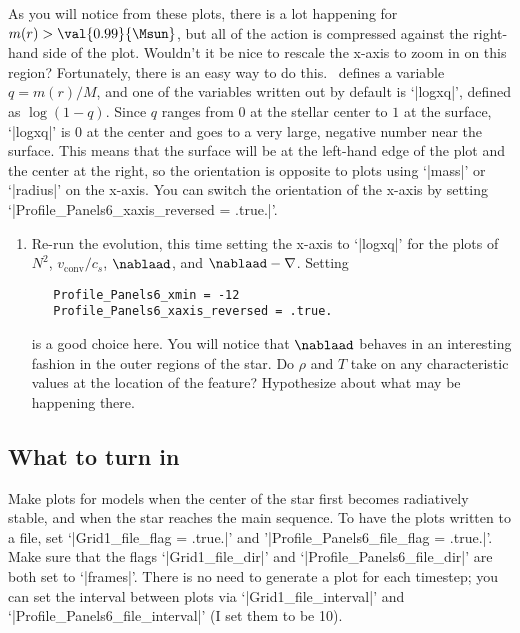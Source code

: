 As you will notice from these plots, there is a lot happening for $m(r) > \val{0.99}{\Msun}$, but all of the action is compressed against the right-hand side of the plot.  Wouldn't it be nice to rescale the x-axis to zoom in on this region?  Fortunately, there is an easy way to do this.  \mesa\ defines a variable $q = m(r)/M$, and one of the variables written out by default is `|logxq|', defined as $\log(1-q)$. Since $q$ ranges from $0$ at the stellar center to $1$ at the surface, `|logxq|' is $0$ at the center and goes to a very large, negative number near the surface. This means that the surface will be at the left-hand edge of the plot and the center at the right, so the orientation is opposite to plots using `|mass|' or `|radius|' on the x-axis.  You can switch the orientation of the x-axis by setting `|Profile_Panels6_xaxis_reversed = .true.|'.

\begin{exercisebox}
\begin{enumerate}
\item Re-run the evolution, this time setting the x-axis to `|logxq|' for the plots of $N^{2}$, $v_{\mathrm{conv}}/c_{s}$, $\nablaad$, and $\nablaad-\nabla$.  Setting
\begin{Verbatim}
   Profile_Panels6_xmin = -12
   Profile_Panels6_xaxis_reversed = .true.
\end{Verbatim}
is a good choice here. You will notice that $\nablaad$ behaves in an interesting fashion in the outer regions of the star.  Do $\rho$ and $T$ take on any characteristic values at the location of the feature?  Hypothesize about what may be happening there.
\end{enumerate}
\end{exercisebox}

\subsection{What to turn in}
Make plots for models when the center of the star first becomes radiatively stable, and when the star reaches the main sequence.  To have the plots written to a file, set
`|Grid1_file_flag = .true.|' and '|Profile_Panels6_file_flag = .true.|'.  Make sure that the flags `|Grid1_file_dir|' and `|Profile_Panels6_file_dir|' are both set to `|frames|'.  There is no need to generate a plot for each timestep; you can set the interval between plots via `|Grid1_file_interval|' and `|Profile_Panels6_file_interval|' (I set them to be 10).

\UndefineShortVerb{\|}
